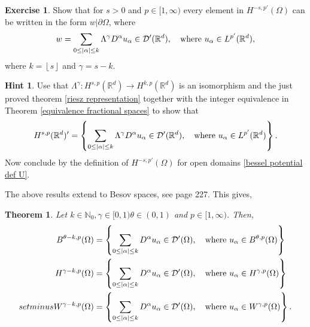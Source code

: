 \documentclass[
    a4paper,
    DIV=14,
    abstract=true,
    numbers=noenddot
]
{scrartcl}
\newtheorem{theorem}{Theorem}[section]
\theoremstyle{definition}
\newtheorem{exercise}{Exercise}
\newtheorem*{hint}{Hint}
\newcommand{\set}[1]{\left\{#1\right\}}
\newcommand\restr[2]{\left.#1\right|{#2}}
\newcommand{\N}{\mathbb{N}}
\newcommand{\R}{\mathbb{R}}
\newcommand{\Dd}{\mathcal{D}}
\begin{document}
\begin{exercise}
  Show that for $s>0$ and $p \in [1,\infty)$ every element in $H^{-s,p'}(\Omega )$ can be written in the form $\restr{w}{\partial \Omega }$, where
  \begin{align*}
    w=\sum_{0\leq\abs{\alpha}\leq k} \Lambda^{\gamma } D^\alpha u_\alpha\in \Dd'(\R^d ),\quad \text{where }    u_\alpha \in L^{p'}(\R^d ),
  \end{align*}
  where $k =\left\lfloor s \right\rfloor$ and $\gamma =s-k$.
\end{exercise}
\begin{hint}
  Use that $\Lambda ^{\gamma }: H^{s,p}(\R^d) \to H^{k ,p}(\R^d)$ is an isomorphism and the just proved theorem \ref{riesz representation} together with the integer equivalence in Theorem \ref{equivalence fractional spaces} to show that
  \begin{align*}
    H^{s,p}(\R^d)' = \set{ \sum_{0\leq\abs{\alpha}\leq k} \Lambda^{\gamma } D^\alpha u_\alpha\in \Dd'(\R^d ),\quad \text{where }    u_\alpha \in L^{p'}(\R^d )}.
  \end{align*}
  Now conclude by the definition of $H^{-s,p'}(\Omega )$ for open domains \ref{bessel potential def U}.
\end{hint}
The above results extend to Besov spaces, see \cite{agranovich2015sobolev} page 227. This gives,
\begin{theorem}
  Let  $k \in \N_0, \gamma \in [0,1) \theta \in (0,1)$ and $p \in [1,\infty)$. Then,
  \begin{align*}
    B^{\theta  -k,p}(\Omega ) & = \set{ \sum_{0\leq\abs{\alpha}\leq k} D^\alpha u_\alpha\in \Dd'(\Omega ),\quad \text{where }    u_\alpha \in B^{\theta  ,p}(\Omega )} \\
    H^{\gamma -k,p}(\Omega )  & = \set{ \sum_{0\leq\abs{\alpha}\leq k} D^\alpha u_\alpha\in \Dd'(\Omega ),\quad \text{where }    u_\alpha \in H^{\gamma ,p}(\Omega )}  \\setminus	W^{\gamma -k,p}(\Omega )  & = \set{ \sum_{0\leq\abs{\alpha}\leq k} D^\alpha u_\alpha\in \Dd'(\Omega ),\quad \text{where }    u_\alpha \in W^{\gamma ,p}(\Omega )}.
  \end{align*}
\end{theorem}
\end{document}
